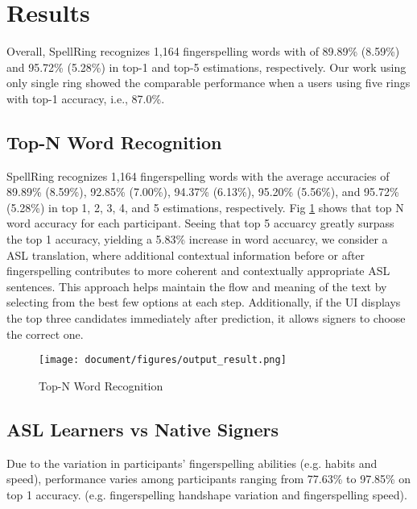 \section{Results}
Overall, SpellRing recognizes 1,164 fingerspelling words with of 89.89\% (8.59\%) and 95.72\% (5.28\%) in top-1 and top-5 estimations, respectively. 
Our work using only single ring showed the comparable performance when a users using five rings \cite{martin2023fingerspeller} with top-1 accuracy, i.e., 87.0\%. 



\subsection{Top-N Word Recognition}

SpellRing recognizes 1,164 fingerspelling words with the average accuracies of 89.89\% (8.59\%), 92.85\% (7.00\%), 94.37\% (6.13\%), 95.20\% (5.56\%), and 95.72\% (5.28\%) in top 1, 2, 3, 4, and 5 estimations, respectively. Fig \ref{fig:performance_tops} shows that top N word accuracy for each participant. Seeing that top 5 accuarcy greatly surpass the top 1 accuracy, yielding a 5.83\% increase in word accuarcy, we consider a ASL translation, where additional contextual information before or after fingerspelling contributes to more coherent and contextually appropriate ASL sentences. This approach helps maintain the flow and meaning of the text by selecting from the best few options at each step. Additionally, if the UI displays the top three candidates immediately after prediction, it allows signers to choose the correct one. 

\begin{figure}
  \texttt{[image: document/figures/output\_result.png]}
  \caption{Top-N Word Recognition}
  \Description{}
  \label{fig:performance_tops}
\end{figure}



\subsection{ASL Learners vs Native Signers}
Due to the variation in participants' fingerspelling abilities (e.g. habits and speed), performance varies among participants ranging from 77.63\% to 97.85\% on top 1 accuracy. (e.g. fingerspelling handshape variation and fingerspelling speed). 

